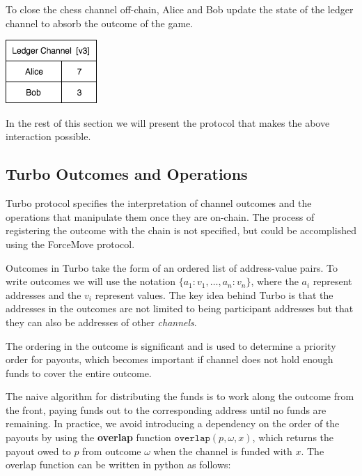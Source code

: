 \documentclass{article}
\theoremstyle{definition}
\begin{document}
To close the chess channel off-chain, Alice and Bob update the state of the ledger channel to absorb the outcome of the game.

\begin{center}
  \includegraphics[scale=0.5]{turbo_finish} %
\end{center}

In the rest of this section we will present the protocol that makes the above interaction
possible.

\subsection{Turbo Outcomes and Operations}

Turbo protocol specifies the interpretation of channel outcomes and the operations that
manipulate them once they are on-chain.
The process of registering the outcome with the chain is not specified, but could be accomplished
using the ForceMove protocol.

Outcomes in Turbo take the form of an ordered list of address-value pairs.
To write outcomes we will use the notation $\{a_1{:}v_1, \dots, a_n{:}v_n \}$, where the $a_i$
represent addresses and the $v_i$ represent values.
The key idea behind Turbo is that the addresses in the outcomes are not limited to being
participant addresses but that they can also be addresses of other \textit{channels}.

The ordering in the outcome is significant and is used to determine a priority order for payouts,
which becomes important if channel does not hold enough funds to cover the entire outcome.

The naive algorithm for distributing the funds is to work along the outcome from the front,
paying funds out to the corresponding address until no funds are remaining.
In practice, we avoid introducing a dependency on the order of the payouts by using
the \textbf{overlap} function $\texttt{overlap}(p, \omega, x)$, which returns the payout owed
to $p$ from outcome $\omega$ when the channel is funded with $x$.
The overlap function can be written in python as follows:

\begin{minipage}{\linewidth} %
  
\end{minipage}
\end{document}
